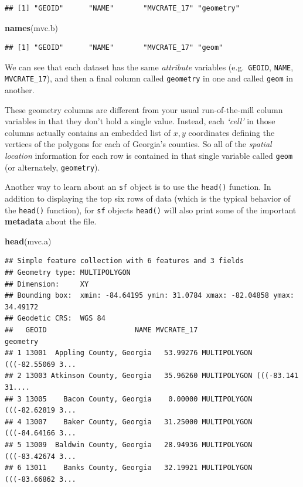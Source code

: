 \documentclass[
]{book}
\newenvironment{Shaded}{\begin{snugshade}}{\end{snugshade}}
\newcommand{\FunctionTok}[1]{\textcolor[rgb]{0.13,0.29,0.53}{\textbf{#1}}}
\newcommand{\NormalTok}[1]{#1}
\begin{document}
\begin{verbatim}
## [1] "GEOID"      "NAME"       "MVCRATE_17" "geometry"
\end{verbatim}

\begin{Shaded}
\begin{Highlighting}[]
\FunctionTok{names}\NormalTok{(mvc.b)}
\end{Highlighting}
\end{Shaded}

\begin{verbatim}
## [1] "GEOID"      "NAME"       "MVCRATE_17" "geom"
\end{verbatim}

We can see that each dataset has the same \emph{attribute} variables (e.g.~\texttt{GEOID}, \texttt{NAME}, \texttt{MVCRATE\_17}), and then a final column called \texttt{geometry} in one and called \texttt{geom} in another.

These geometry columns are different from your usual run-of-the-mill column variables in that they don't hold a single value. Instead, each \emph{`cell'} in those columns actually contains an embedded list of \(x,y\) coordinates defining the vertices of the polygons for each of Georgia's counties. So all of the \emph{spatial location} information for each row is contained in that single variable called \texttt{geom} (or alternately, \texttt{geometry}).

Another way to learn about an \texttt{sf} object is to use the \texttt{head()} function. In addition to displaying the top six rows of data (which is the typical behavior of the \texttt{head()} function), for \texttt{sf} objects \texttt{head()} will also print some of the important \textbf{metadata} about the file.

\begin{Shaded}
\begin{Highlighting}[]
\FunctionTok{head}\NormalTok{(mvc.a)}
\end{Highlighting}
\end{Shaded}

\begin{verbatim}
## Simple feature collection with 6 features and 3 fields
## Geometry type: MULTIPOLYGON
## Dimension:     XY
## Bounding box:  xmin: -84.64195 ymin: 31.0784 xmax: -82.04858 ymax: 34.49172
## Geodetic CRS:  WGS 84
##   GEOID                     NAME MVCRATE_17                       geometry
## 1 13001  Appling County, Georgia   53.99276 MULTIPOLYGON (((-82.55069 3...
## 2 13003 Atkinson County, Georgia   35.96260 MULTIPOLYGON (((-83.141 31....
## 3 13005    Bacon County, Georgia    0.00000 MULTIPOLYGON (((-82.62819 3...
## 4 13007    Baker County, Georgia   31.25000 MULTIPOLYGON (((-84.64166 3...
## 5 13009  Baldwin County, Georgia   28.94936 MULTIPOLYGON (((-83.42674 3...
## 6 13011    Banks County, Georgia   32.19921 MULTIPOLYGON (((-83.66862 3...
\end{verbatim}
\end{document}

